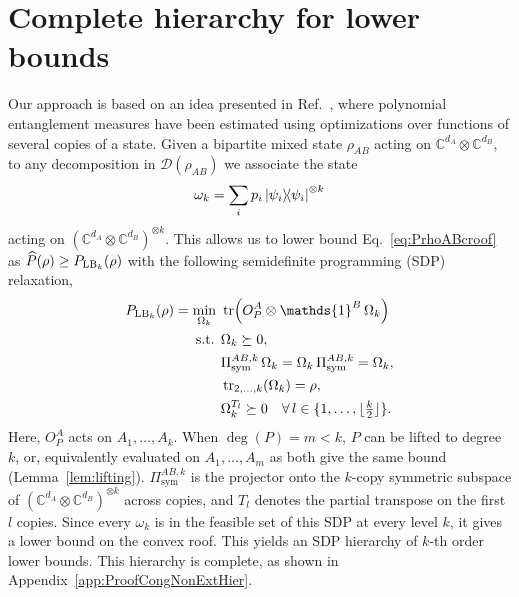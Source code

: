 \documentclass[aps,pra,twocolumn,showpacs,superscriptaddress,groupedaddress]{revtex4-2}
\newcommand{\one}[0]{\mathds{1}}
\newcommand{\C}{\mathds{C}}
\newcommand{\I}{\one}
\begin{document}
\section{Complete hierarchy for lower bounds}
Our approach is based on an idea presented in Ref.~\cite{Toth2015CroofTP}, where polynomial entanglement measures have been estimated using 
optimizations over functions of several copies of a state.
Given a bipartite mixed state $\rho_{AB}$ acting on $\C^{d_A} \otimes \C^{d_B}$, to any decomposition in $\mathcal{D}(\rho_{AB})$ we associate the state
\begin{equation}\label{eq:omega}
    \omega_k = \sum_i p_i \dyad{\psi_i}^{\otimes k}
\end{equation}
acting on $(\C^{d_A} \otimes \C^{d_B})^{\otimes k}$.
This allows us to lower bound Eq.~\eqref{eq:PrhoABcroof} as $\widehat{P}(\rho)\geq P_{{\rm LB}_k}(\rho)$ with the following semidefinite programming (SDP) relaxation,
\begin{align}
    P_{{\rm LB}_k}(\rho)=\min_{\Omega_k} \ &\tr\!\left(O_P^A \otimes \I^B \, \Omega_k\right)\label{eq:SDPcroof1}\\
    \text{s.t. } & \Omega_k \succeq 0, \nonumber\\
    & \Pi_\text{sym}^{AB,k} \, \Omega_k = \Omega_k\,\Pi_\text{sym}^{AB,k}  = \Omega_k,\nonumber\\
    & \tr_{2,\dots,k} (\Omega_k) = \rho, \nonumber\\
    & \Omega_k^{T_l} \succeq 0 \quad  \forall \, l \in \{1, \dots, \lfloor \tfrac{k}{2}\rfloor\}.\nonumber
\end{align}
Here, $O_P^A$ acts on $A_1,\dots,A_k$. When $\deg(P) = m < k$, $P$ can be lifted to degree $k$, or, equivalently evaluated on $A_1,\dots,A_m$ as both give the same bound (Lemma~\ref{lem:lifting}). $\Pi_\text{sym}^{AB,k}$ is the projector onto the $k$-copy symmetric subspace of $(\C^{d_A}\otimes\C^{d_B})^{\otimes k}$ across copies, and $T_l$ denotes the partial transpose on the first $l$ copies. Since every $\omega_k$ is in the feasible set of this SDP at every level $k$, it gives a lower bound on the convex roof. This yields an SDP hierarchy of $k$-th order lower bounds. This hierarchy is complete, as shown in Appendix~\ref{app:ProofCongNonExtHier}.
\end{document}
